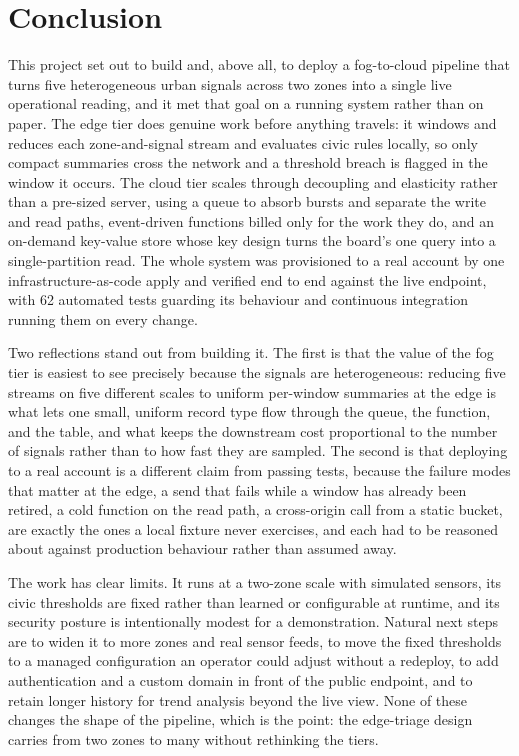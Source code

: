 \documentclass[conference]{IEEEtran}
\begin{document}
\section{Conclusion}

This project set out to build and, above all, to deploy a fog-to-cloud pipeline that turns five heterogeneous urban signals across two zones into a single live operational reading, and it met that goal on a running system rather than on paper. The edge tier does genuine work before anything travels: it windows and reduces each zone-and-signal stream and evaluates civic rules locally, so only compact summaries cross the network and a threshold breach is flagged in the window it occurs. The cloud tier scales through decoupling and elasticity rather than a pre-sized server, using a queue to absorb bursts and separate the write and read paths, event-driven functions billed only for the work they do, and an on-demand key-value store whose key design turns the board's one query into a single-partition read. The whole system was provisioned to a real account by one infrastructure-as-code apply and verified end to end against the live endpoint, with 62 automated tests guarding its behaviour and continuous integration running them on every change.

Two reflections stand out from building it. The first is that the value of the fog tier is easiest to see precisely because the signals are heterogeneous: reducing five streams on five different scales to uniform per-window summaries at the edge is what lets one small, uniform record type flow through the queue, the function, and the table, and what keeps the downstream cost proportional to the number of signals rather than to how fast they are sampled. The second is that deploying to a real account is a different claim from passing tests, because the failure modes that matter at the edge, a send that fails while a window has already been retired, a cold function on the read path, a cross-origin call from a static bucket, are exactly the ones a local fixture never exercises, and each had to be reasoned about against production behaviour rather than assumed away.

The work has clear limits. It runs at a two-zone scale with simulated sensors, its civic thresholds are fixed rather than learned or configurable at runtime, and its security posture is intentionally modest for a demonstration. Natural next steps are to widen it to more zones and real sensor feeds, to move the fixed thresholds to a managed configuration an operator could adjust without a redeploy, to add authentication and a custom domain in front of the public endpoint, and to retain longer history for trend analysis beyond the live view. None of these changes the shape of the pipeline, which is the point: the edge-triage design carries from two zones to many without rethinking the tiers.
\end{document}
